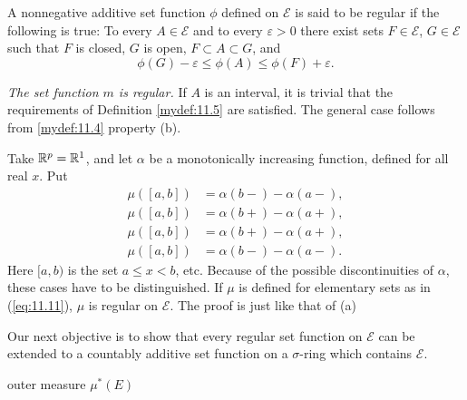 \begin{mydef}
    \label{mydef:11.5}
    A nonnegative additive set function $\phi$ defined on $\mathscr{E}$ is said to be regular if the following is true: 
    To every $A \in \mathscr{E}$ and to every $\varepsilon > 0$ 
    there exist sets $F \in \mathscr{E}$, $G \in \mathscr{E}$ 
    such that $F$ is closed, $G$ is open, $F \subset A \subset G$, 
    and
    \begin{equation}
        \label{eq:11.16}
        \phi(G) - \varepsilon \leq 
        \phi(A) \leq 
        \phi(F) + \varepsilon . 
    \end{equation}
\end{mydef}

\begin{newexample}
    \begin{asparaenum}[(a)]
        \item \emph{The set function $m$ is regular.}
        If $A$ is an interval, it is trivial that the requirements of Definition \ref{mydef:11.5} are satisfied. The general case follows from \ref{mydef:11.4} property (b).
        \item Take ${\protect\mathbb R}^p = {\protect\mathbb R}^1$, and let $\alpha$ be a monotonically increasing function, defined for all real $x$. Put 
        \begin{align*}
            \mu([a,b]) &= \alpha(b-)-\alpha(a-),\\
            \mu([a,b]) &= \alpha(b+)-\alpha(a+),\\
            \mu([a,b]) &= \alpha(b+)-\alpha(a+),\\
            \mu([a,b]) &= \alpha(b-)-\alpha(a-).
        \end{align*}
        Here $[a,b)$ is the set $a \leq x < b$, etc.
        Because of the possible discontinuities of $\alpha$, these cases have to be distinguished.
        If $\mu$ is defined for elementary sets as in (\ref{eq:11.11}), $\mu$ is regular on $\mathscr{E}$.
        The proof is just like that of (a)
    \end{asparaenum}
\end{newexample}

Our next objective is to show that every regular set function on $\mathscr{E}$ can be
extended to a countably additive set function on a $\sigma$-ring which contains $\mathscr{E}$.

\begin{mydef}
    \label{mydef:11.7}
    outer measure $\mu^*(E)$
\end{mydef}


